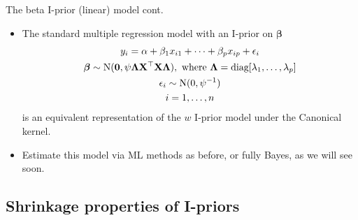 \documentclass[]{beamer}\usepackage[]{graphicx}\usepackage[]{color}
\newcommand{\N}{\text{\normalfont N}}
\begin{document}
\begin{frame}[<+->]{The beta I-prior (linear) model cont.}
	\begin{itemize}

		\item The standard multiple regression model with an I-prior on $\boldsymbol{\beta}$
		\begin{align}\label{eq:betaiprior}
			\begin{gathered}
				y_i = \alpha + \beta_1 x_{i1} + \dots + \beta_p x_{ip} + \epsilon_i \\
				\boldsymbol\beta \sim \N(\mathbf 0, \psi\boldsymbol\Lambda \mathbf X ^\top \mathbf X \boldsymbol\Lambda), \text{ where } \boldsymbol\Lambda = \text{diag}[\lambda_1, \dots, \lambda_p]\\
				\epsilon_i \sim \text{N}(0, \psi^{-1})  \\
				i=1,\dots,n
			\end{gathered}
		\end{align}
		is an equivalent representation of the $w$ I-prior model under the Canonical kernel.

		\item Estimate this model via ML methods as before, or fully Bayes, as we will see soon.
	\end{itemize}
\end{frame}

\subsection{Shrinkage properties of I-priors}
\end{document}
